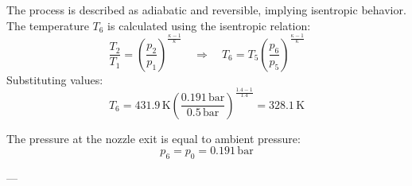 The process is described as adiabatic and reversible, implying isentropic behavior. The temperature \( T_6 \) is calculated using the isentropic relation:  
\[
\frac{T_2}{T_1} = \left( \frac{p_2}{p_1} \right)^{\frac{\kappa - 1}{\kappa}} \quad \Rightarrow \quad T_6 = T_5 \left( \frac{p_6}{p_5} \right)^{\frac{\kappa - 1}{\kappa}}
\]  
Substituting values:  
\[
T_6 = 431.9 \, \text{K} \left( \frac{0.191 \, \text{bar}}{0.5 \, \text{bar}} \right)^{\frac{1.4 - 1}{1.4}} = 328.1 \, \text{K}
\]  

The pressure at the nozzle exit is equal to ambient pressure:  
\[
p_6 = p_0 = 0.191 \, \text{bar}
\]  

---